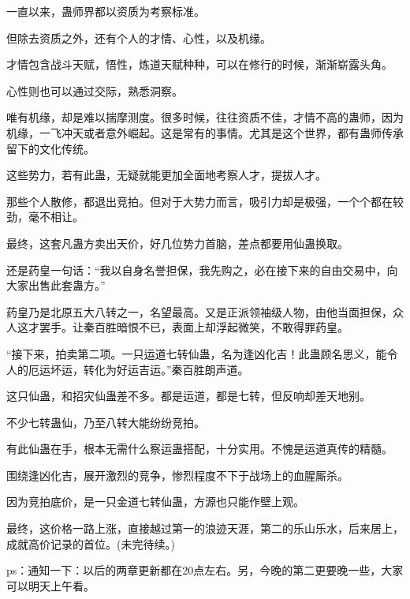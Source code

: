 \begin{this_body}
一直以来，蛊师界都以资质为考察标准。

但除去资质之外，还有个人的才情、心性，以及机缘。

才情包含战斗天赋，悟性，炼道天赋种种，可以在修行的时候，渐渐崭露头角。

心性则也可以通过交际，熟悉洞察。

唯有机缘，却是难以揣摩测度。很多时候，往往资质不佳，才情不高的蛊师，因为机缘，一飞冲天或者意外崛起。这是常有的事情。尤其是这个世界，都有蛊师传承留下的文化传统。

这些势力，若有此蛊，无疑就能更加全面地考察人才，提拔人才。

那些个人散修，都退出竞拍。但对于大势力而言，吸引力却是极强，一个个都在较劲，毫不相让。

最终，这套凡蛊方卖出天价，好几位势力首脑，差点都要用仙蛊换取。

还是药皇一句话：“我以自身名誉担保，我先购之，必在接下来的自由交易中，向大家出售此套蛊方。”

药皇乃是北原五大八转之一，名望最高。又是正派领袖级人物，由他当面担保，众人这才罢手。让秦百胜暗恨不已，表面上却浮起微笑，不敢得罪药皇。

“接下来，拍卖第二项。一只运道七转仙蛊，名为逢凶化吉！此蛊顾名思义，能令人的厄运坏运，转化为好运吉运。”秦百胜朗声道。

这只仙蛊，和招灾仙蛊差不多。都是运道，都是七转，但反响却差天地别。

不少七转蛊仙，乃至八转大能纷纷竞拍。

有此仙蛊在手，根本无需什么察运蛊搭配，十分实用。不愧是运道真传的精髓。

围绕逢凶化吉，展开激烈的竞争，惨烈程度不下于战场上的血腥厮杀。

因为竞拍底价，是一只金道七转仙蛊，方源也只能作壁上观。

最终，这价格一路上涨，直接越过第一的浪迹天涯，第二的乐山乐水，后来居上，成就高价记录的首位。(未完待续。)

ps：通知一下：以后的两章更新都在20点左右。另，今晚的第二更要晚一些，大家可以明天上午看。

\end{this_body}

